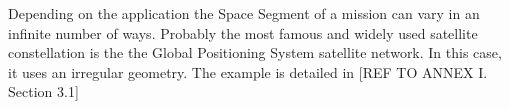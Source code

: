 Depending on the application the Space Segment of a mission can vary in an infinite number of ways. Probably the most famous and widely used satellite constellation is the the Global Positioning System satellite network. In this case, it uses an irregular geometry. The example is detailed in [{REF TO ANNEX I. Section 3.1}]